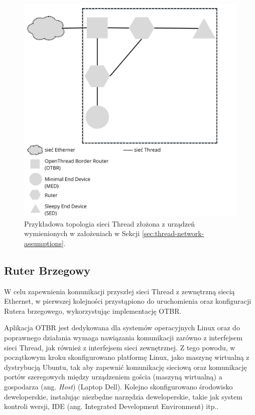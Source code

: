        \begin{figure}[H]
            \centering
            \includegraphics[width=0.8\linewidth]{graphics/thread-topology.png}
            \caption{Przykładowa topologia sieci Thread złożona z urządzeń wymienionych w założeniach w Sekcji \ref{sec:thread-network-assumptions}.}
            \label{fig:thread-topology}
        \end{figure}

    \subsection{Ruter Brzegowy}

        W celu zapewnienia komunikacji przyszłej sieci Thread z zewnętrzną siecią Ethernet, w pierwszej kolejności przystąpiono do uruchomienia oraz konfiguracji Rutera brzegowego, wykorzystując implementację OTBR. 
        
        Aplikacja OTBR jest dedykowana dla systemów operacyjnych Linux oraz do poprawnego działania wymaga nawiązania komunikacji zarówno z interfejsem sieci Thread, jak również z interfejsem sieci zewnętrznej. Z tego powodu, w początkowym kroku skonfigurowano platformę Linux, jako maszynę wirtualną z dystrybucją Ubuntu, tak aby zapewnić komunikację sieciową oraz komunikację portów szeregowych między urządzeniem gościa (maszyną wirtualną) a gospodarza (ang. \textit{Host}) (Laptop Dell). Kolejno skonfigurowano środowisko deweloperskie, instalując niezbędne narzędzia deweloperskie, takie jak system kontroli wersji, IDE (ang. Integrated Development Environment) itp.. 
        
